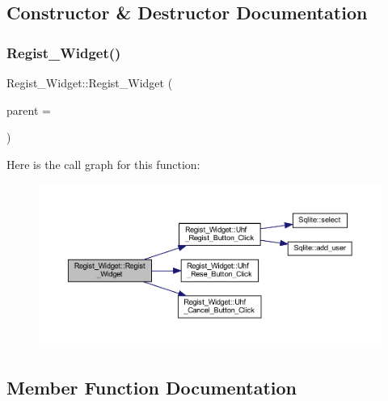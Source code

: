 \subsection{Constructor \& Destructor Documentation}
\mbox{\label{class_regist___widget_a33b39fa0b699001b9e41cd91ae7ea4ec}} 
\subsubsection{\texorpdfstring{Regist\_Widget()}{Regist\_Widget()}}
{\footnotesize\ttfamily Regist\+\_\+\+Widget\+::\+Regist\+\_\+\+Widget (\begin{DoxyParamCaption}\item[{Q\+Widget $\ast$}]{parent = {} }\end{DoxyParamCaption})\hspace{0.3cm}{\ttfamily [explicit]}}

Here is the call graph for this function\+:
\nopagebreak
\begin{figure}[H]
\begin{center}
\leavevmode
\includegraphics[width=350pt]{class_regist___widget_a33b39fa0b699001b9e41cd91ae7ea4ec_cgraph}
\end{center}
\end{figure}


\subsection{Member Function Documentation}
\mbox{\label{class_regist___widget_a1493d37070ac8d626fafa8239be147a7}} 
